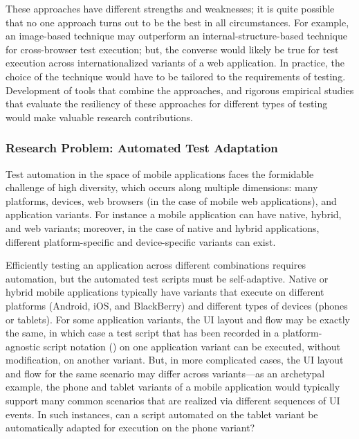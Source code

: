 These approaches have different strengths and weaknesses; it is quite possible
that no one approach turns out to be the best in all circumstances. For example,
an image-based technique may outperform an internal-structure-based technique
for cross-browser test execution; but, the converse would likely be true for
test execution across internationalized variants of a web application. In
practice, the choice of the technique would have to be tailored to the
requirements of testing.  Development of tools that combine the approaches, and
rigorous empirical studies that evaluate the resiliency of these approaches for
different types of testing would make valuable research contributions.


\subsubsection*{Research Problem: Automated Test Adaptation}

Test automation in the space of mobile applications faces the form\-idable
challenge of high diversity, which occurs along multiple dimensions: many
platforms, devices, web browsers (in the case of mobile web applications), and
application variants. For instance a mobile application can have native, hybrid,
and web variants; moreover, in the case of native and hybrid applications,
different platform-specific and device-specific variants can exist.

Efficiently testing an application across different combinations requires
automation, but the automated test scripts must be self-adaptive. Native or
hybrid mobile applications typically have variants that execute on different
platforms (\eg Android, iOS, and BlackBerry) and different types of devices
(phones or tablets). For some application variants, the UI layout and flow may
be exactly the same, in which case a test script that has been recorded in a
platform-agnostic script notation (\eg \cite{PerfectoScriptOnce}) on one
application variant can be executed, without modification, on another
variant. But, in more complicated cases, the UI layout and flow for the same
scenario may differ across variants---as an archetypal example, the phone and
tablet variants of a mobile application would typically support many common
scenarios that are realized via different sequences of UI events. In such
instances, can a script automated on the tablet variant be automatically adapted
for execution on the phone variant?

